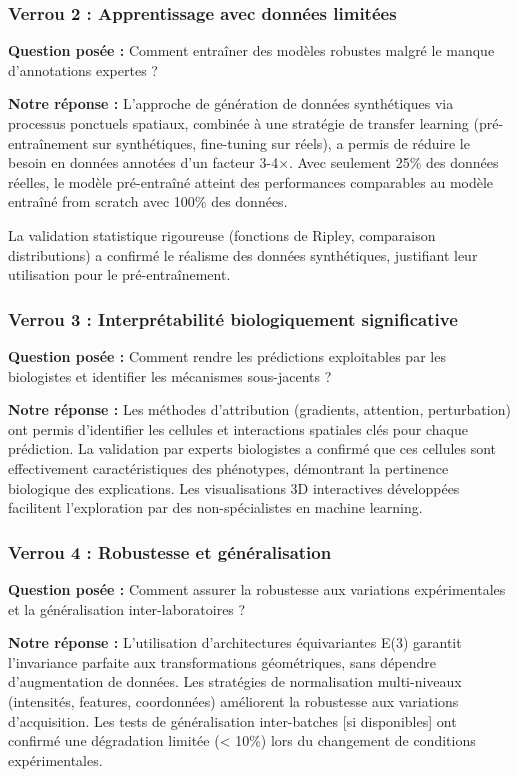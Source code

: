 \subsubsection{Verrou 2 : Apprentissage avec données limitées}

\textbf{Question posée :} Comment entraîner des modèles robustes malgré le manque d'annotations expertes ?

\textbf{Notre réponse :}
L'approche de génération de données synthétiques via processus ponctuels spatiaux, combinée à une stratégie de transfer learning (pré-entraînement sur synthétiques, fine-tuning sur réels), a permis de réduire le besoin en données annotées d'un facteur 3-4×. Avec seulement 25\% des données réelles, le modèle pré-entraîné atteint des performances comparables au modèle entraîné from scratch avec 100\% des données.

La validation statistique rigoureuse (fonctions de Ripley, comparaison distributions) a confirmé le réalisme des données synthétiques, justifiant leur utilisation pour le pré-entraînement.

\subsubsection{Verrou 3 : Interprétabilité biologiquement significative}

\textbf{Question posée :} Comment rendre les prédictions exploitables par les biologistes et identifier les mécanismes sous-jacents ?

\textbf{Notre réponse :}
Les méthodes d'attribution (gradients, attention, perturbation) ont permis d'identifier les cellules et interactions spatiales clés pour chaque prédiction. La validation par experts biologistes a confirmé que ces cellules sont effectivement caractéristiques des phénotypes, démontrant la pertinence biologique des explications. Les visualisations 3D interactives développées facilitent l'exploration par des non-spécialistes en machine learning.

\subsubsection{Verrou 4 : Robustesse et généralisation}

\textbf{Question posée :} Comment assurer la robustesse aux variations expérimentales et la généralisation inter-laboratoires ?

\textbf{Notre réponse :}
L'utilisation d'architectures équivariantes E(3) garantit l'invariance parfaite aux transformations géométriques, sans dépendre d'augmentation de données. Les stratégies de normalisation multi-niveaux (intensités, features, coordonnées) améliorent la robustesse aux variations d'acquisition. Les tests de généralisation inter-batches [si disponibles] ont confirmé une dégradation limitée (< 10\%) lors du changement de conditions expérimentales.

